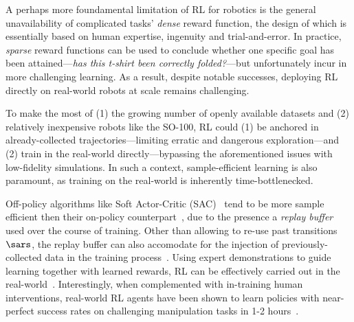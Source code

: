 A perhaps more foundamental limitation of RL for robotics is the general unavailability of complicated tasks' \emph{dense} reward function, the design of which is essentially based on human expertise, ingenuity and trial-and-error.
In practice, \emph{sparse} reward functions can be used to conclude whether one specific goal has been attained---\emph{has this t-shirt been correctly folded?}---but unfortunately incur in more challenging learning.
As a result, despite notable successes, deploying RL directly on real-world robots at scale remains challenging.

To make the most of (1) the growing number of openly available datasets and (2) relatively inexpensive robots like the SO-100, RL could (1) be anchored in already-collected trajectories---limiting erratic and dangerous exploration---and (2) train in the real-world directly---bypassing the aforementioned issues with low-fidelity simulations.
In such a context, sample-efficient learning is also paramount, as training on the real-world is inherently time-bottlenecked.

Off-policy algorithms like Soft Actor-Critic (SAC)~\citep{haarnojaSoftActorCriticOffPolicy2018} tend to be more sample efficient then their on-policy counterpart~\citep{schulmanProximalPolicyOptimization2017}, due to the presence a \emph{replay buffer} used over the course of training.
Other than allowing to re-use past transitions \( \sars \), the replay buffer can also accomodate for the injection of previously-collected data in the training process~\citep{ballEfficientOnlineReinforcement2023}.
Using expert demonstrations to guide learning together with learned rewards, RL can be effectively carried out in the real-world~\citep{luoSERLSoftwareSuite2025}.
Interestingly, when complemented with in-training human interventions, real-world RL agents have been shown to learn policies with near-perfect success rates on challenging manipulation tasks in 1-2 hours~\citep{luoPreciseDexterousRobotic2024}.

